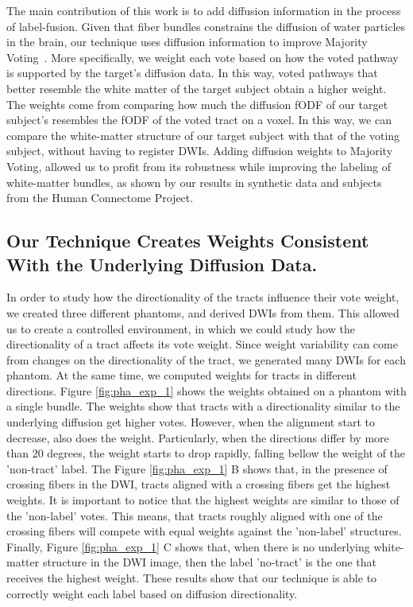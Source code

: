 The main contribution of this work is to add diffusion information in the process of label-fusion. Given that fiber
bundles constrains the diffusion of
water particles in the brain, our technique uses diffusion information to improve
Majority Voting~\cite{Xu1992}. More specifically, we weight each vote based on how
the voted pathway is supported by the target's diffusion data. In this way, voted
pathways that better resemble the white matter of the target subject obtain a 
higher weight. The weights come from comparing how much the diffusion fODF of our
target subject's resembles the fODF of the voted tract on a voxel. In this way, we
can compare the white-matter structure of our target subject with that of the voting
subject, without having to register DWIs. Adding diffusion weights to Majority Voting,
allowed us to profit from its robustness while improving the labeling of white-matter
bundles, as shown by our results in synthetic data and subjects from the Human
Connectome Project.

\subsection{Our Technique Creates Weights Consistent With the Underlying
               Diffusion Data.}
In order to study how the directionality of the tracts influence their vote weight,
we created three different phantoms, and derived DWIs from them. This allowed us to
create a controlled environment, in which we could study how the directionality
of a tract affects its vote weight. Since weight variability can
come from changes on the directionality of the tract, we generated many DWIs
for each phantom. At the same time, we computed weights for tracts in different
directions. Figure \ref{fig:pha_exp_1} shows the weights obtained on a phantom
with a single bundle. The weights show that tracts with a directionality
similar to the underlying diffusion get higher votes. However, when the alignment
start to decrease, also does the weight. Particularly, when the directions
differ by more than 20 degrees, the weight starts to drop rapidly, falling bellow the weight of the
'non-tract' label.
The Figure \ref{fig:pha_exp_1} B shows that, in the presence of crossing fibers
in the DWI, tracts aligned with a crossing fibers get the highest weights.
It is important to notice that the highest weights are similar to those of the
'non-label' votes. This means, that tracts roughly aligned with one of the
crossing fibers will compete with equal weights against the 'non-label' structures.
Finally, Figure \ref{fig:pha_exp_1} C shows that, when there is no underlying
white-matter structure in the DWI image,
then the label 'no-tract' is the one that receives the highest weight. These
results show that our technique is able to correctly weight each label based
on diffusion directionality.

